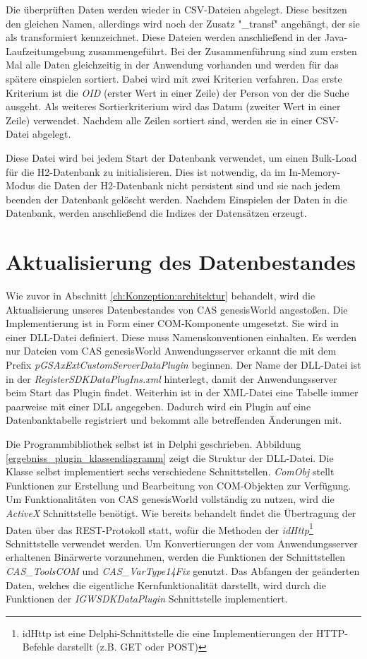 Die überprüften Daten werden wieder in CSV-Dateien abgelegt. Diese besitzen den gleichen Namen, allerdings wird noch der Zusatz "\_transf" angehängt, der sie als transformiert kennzeichnet. Diese Dateien werden anschließend in der Java-Laufzeitumgebung zusammengeführt. Bei der Zusammenführung sind zum ersten Mal alle Daten gleichzeitig in der Anwendung vorhanden und werden für das spätere einspielen sortiert. Dabei wird mit zwei Kriterien verfahren. Das erste Kriterium ist die \textit{OID} (erster Wert in einer Zeile) der Person von der die Suche ausgeht. Als weiteres Sortierkriterium wird das Datum (zweiter Wert in einer Zeile) verwendet. Nachdem alle Zeilen sortiert sind, werden sie in einer CSV-Datei abgelegt. 

Diese Datei wird bei jedem Start der Datenbank verwendet, um einen Bulk-Load für die H2-Datenbank zu initialisieren. Dies ist notwendig, da im In-Memory-Modus die Daten der H2-Datenbank nicht persistent sind und sie nach jedem beenden der Datenbank gelöscht werden. Nachdem Einspielen der Daten in die Datenbank, werden anschließend die Indizes der Datensätzen erzeugt.

\section{Aktualisierung des Datenbestandes}

Wie zuvor in Abschnitt \ref{ch:Konzeption:architektur} behandelt, wird die Aktualisierung unseres Datenbestandes von CAS genesisWorld angestoßen. Die Implementierung ist in Form einer COM-Komponente umgesetzt. Sie wird in einer DLL-Datei definiert. Diese muss Namenskonventionen einhalten. Es werden nur Dateien vom CAS genesisWorld Anwendungsserver erkannt die mit dem Prefix \textit{pGSAxExtCustomServerDataPlugin} beginnen. Der Name der DLL-Datei ist in der \textit{RegisterSDKDataPlugIns.xml} hinterlegt, damit der Anwendungsserver beim Start das Plugin findet. Weiterhin ist in der XML-Datei eine Tabelle immer paarweise mit einer DLL angegeben. Dadurch wird ein Plugin auf eine Datenbanktabelle registriert und bekommt alle betreffenden Änderungen mit.

Die Programmbibliothek selbst ist in Delphi geschrieben. Abbildung \ref{ergebniss_plugin_klassendiagramm} zeigt die Struktur der DLL-Datei. Die Klasse selbst implementiert sechs verschiedene Schnittstellen. \textit{ComObj} stellt Funktionen zur Erstellung und Bearbeitung von COM-Objekten zur Verfügung. Um Funktionalitäten von CAS genesisWorld vollständig zu nutzen, wird die \textit{ActiveX} Schnittstelle benötigt. Wie bereits behandelt findet die Übertragung der Daten über das REST-Protokoll statt, wofür die Methoden der \textit{idHttp}\footnote{idHttp ist eine Delphi-Schnittstelle die eine Implementierungen der HTTP-Befehle darstellt (z.B. GET oder POST)} Schnittstelle verwendet werden. Um Konvertierungen der vom Anwendungsserver erhaltenen Binärwerte vorzunehmen, werden die Funktionen der Schnittstellen \textit{CAS\_ToolsCOM} und \textit{CAS\_VarType14Fix} genutzt. Das Abfangen der geänderten Daten, welches die eigentliche Kernfunktionalität darstellt, wird durch die Funktionen der \textit{IGWSDKDataPlugin} Schnittstelle implementiert.

